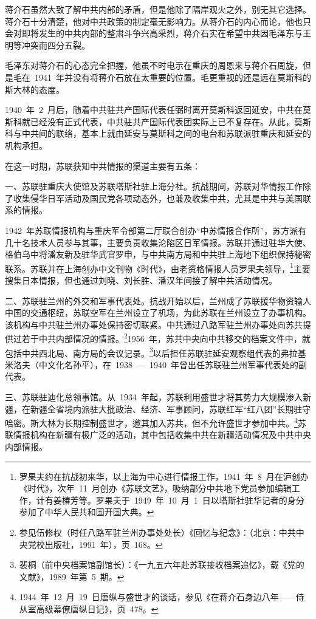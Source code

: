 蒋介石虽然大致了解中共内部的矛盾，但是他除了隔岸观火之外，别无其它选择。蒋介石十分清楚，他对中共政策的制定毫无影响力。从蒋介石的内心而论，他也只会对即将发生的中共内部的整肃斗争兴高采烈，蒋介石实在希望中共因毛泽东与王明等冲突而四分五裂。

毛泽东对蒋介石的心态完全把握，他虽不时电示在重庆的周恩来与蒋介石周旋，但是毛在~1941~年并没有将蒋介石放在太重要的位置。毛更重视的还是远在莫斯科的斯大林的态度。

1940~年~2~月后，随着中共驻共产国际代表任弼时离开莫斯科返回延安，中共在莫斯科就已经没有正式代表，中共驻共产国际代表团实际上已不复存在。从此，莫斯科与中共间的联络，基本上就由延安与莫斯科之间的电台和苏联派驻重庆和延安的机构承担。

在这一时期，苏联获知中共情报的渠道主要有五条：

一、苏联驻重庆大使馆及苏联塔斯社驻上海分社。抗战期间，苏联对华情报工作除了收集侵华日军活动及国民党各项动态外，也兼及收集中共，尤其是中共与美国联系的情报。

1942~年苏联情报机构与重庆军令部第二厅联合创办“中苏情报合作所”，苏方派有几十名技术人员参与其事，主要负责收集沦陷区日军情报。苏联并通过驻华大使、格伯乌中将潘友新及驻华武官罗申，与中共南方局和中共驻上海地下组织保持秘密联系。苏联并在上海创办中文刊物《时代》，由老资格情报人员罗果夫领导，\footnote{罗果夫约在抗战初来华，以上海为中心进行情报工作，1941~年~8~月在沪创办《时代》，次年~11~月创办《苏联文艺》，吸纳部分中共地下党员参加编辑工作，计有姜椿芳等。罗果夫于~1949~年~10~月~1~日以塔斯社驻华记者的身分参加了中华人民共和国开国大典。}主要搜集日本情报，但也通过刘晓、刘长胜、潘汉年间接了解中共活动情况。

二、苏联驻兰州的外交和军事代表处。抗战开始以后，兰州成了苏联援华物资输人中国的交通枢纽，苏联空军在兰州设立了机场，为此苏联在兰州设立了办事机构。该机构与中共驻兰州办事处保持密切联紧。中共通过八路军驻兰州办事处向苏共提供过若于中共内部情况的情报。\footnote{参见伍修权（时任八路军驻兰州办事处处长）《回忆与纪念》：（北京：中共中央党校出版社，1991~年），页~168。}1956~年，苏共中央向中共移交的档案文件中，就包括中共西北局、南方局的会议记录。\footnote{裴桐（前中央档案馆副馆长）：《一九五六年赴苏联接收档案追忆》，载《党的文献》，1989~年第~5~期。}以后担任苏联驻延安观察组代表的弗拉基米洛夫（中文化名孙平），在~1938~—~1940~年曾出任苏联驻兰州军事代表处的副代表。

三、苏联驻迪化总领事馆。从~1934~年起，苏联利用盛世才将其势力大规模渗入新疆，在新疆全省境内派驻大批政治、经济、军事顾问，苏联红军“红八团”长期驻守哈密。斯大林为长期控制盛世才，邀其加入苏共，但不允许盛世才参加中共。\footnote{1944~年~12~月~19~日唐纵与盛世才的谈话，参见《在蒋介石身边八年——侍从室高级幕僚唐纵日记》，页~478。}苏联情报机构在新疆有极广泛的活动，其中包括收集中共在新疆活动情况及中共中央内部情报。

